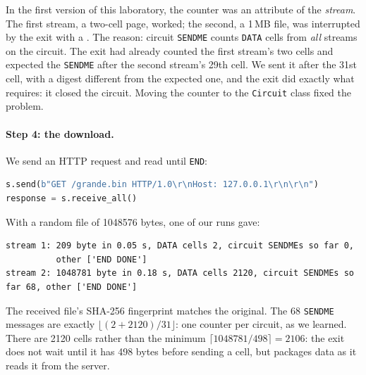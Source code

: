 \begin{attenzione}
In the first version of this laboratory, the counter was an attribute of the \emph{stream}. The first stream, a two-cell page, worked; the second, a 1\,MB file, was interrupted by the exit with a . The reason: circuit \texttt{SENDME} counts \texttt{DATA} cells from \emph{all} streams on the circuit. The exit had already counted the first stream's two cells and expected the \texttt{SENDME} after the second stream's 29th cell. We sent it after the 31st cell, with a digest different from the expected one, and the exit did exactly what  requires: it closed the circuit. Moving the counter to the \texttt{Circuit} class fixed the problem.
\end{attenzione}

\paragraph{Step 4: the download.} We send an HTTP request and read until \texttt{END}:
\begin{lstlisting}[language=Python]
s.send(b"GET /grande.bin HTTP/1.0\r\nHost: 127.0.0.1\r\n\r\n")
response = s.receive_all()
\end{lstlisting}
With a random file of \num{1048576} bytes, one of our runs gave:
\begin{lstlisting}[numbers=none]
stream 1: 209 byte in 0.05 s, DATA cells 2, circuit SENDMEs so far 0,
          other ['END DONE']
stream 2: 1048781 byte in 0.18 s, DATA cells 2120, circuit SENDMEs so far 68, other ['END DONE']
\end{lstlisting}
The received file's SHA-256 fingerprint matches the original. The 68 \texttt{SENDME} messages are exactly $\lfloor (2 + 2120) / 31 \rfloor$: one counter per circuit, as we learned. There are 2120 cells rather than the minimum $\lceil 1048781 / 498 \rceil = 2106$: the exit does not wait until it has 498 bytes before sending a cell, but packages data as it reads it from the server.

